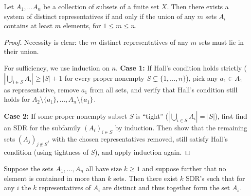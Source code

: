 \begin{theorem}
  \label{ch30theorem3}
  \leanok
  Let  $A_1, \dots A_n$ be a collection of subsets of a finite set $X$.
  Then there exists a system of distinct representatives if and only if the union of any $m$
  sets $A_i$ contains at least $m$ elements, for $1 \le m \le n$.
\end{theorem}
\begin{proof}
  \leanok
  Necessity is clear: the $m$ distinct representatives of any $m$ sets must lie in their union.

  For sufficiency, we use induction on $n$. \textbf{Case 1:} If Hall's condition holds strictly
  ($|\bigcup_{i \in S} A_i| \ge |S| + 1$ for every proper nonempty $S \subsetneq \{1,\dots,n\}$),
  pick any $a_1 \in A_1$ as representative, remove $a_1$ from all sets, and verify that
  Hall's condition still holds for $A_2 \setminus \{a_1\}, \dots, A_n \setminus \{a_1\}$.

  \textbf{Case 2:} If some proper nonempty subset $S$ is ``tight''
  ($|\bigcup_{i \in S} A_i| = |S|$), first find an SDR for the subfamily $(A_i)_{i \in S}$
  by induction. Then show that the remaining sets $(A_j)_{j \notin S}$, with the chosen
  representatives removed, still satisfy Hall's condition (using tightness of $S$),
  and apply induction again.
\end{proof}

\begin{corollary}
  \label{ch30corollary}
  Suppose the sets $A_1, \dots, A_n$ all have size $k \ge 1$ and suppose further that no element
  is contained in more than $k$ sets. Then there exist $k$ SDR's such that for any $i$ the $k$
  representatives of $A_i$ are distinct and thus together form the set $A_i$.
\end{corollary}


